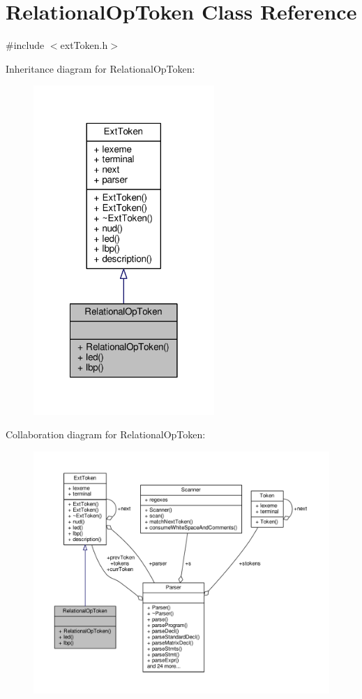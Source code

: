\hypertarget{classRelationalOpToken}{\section{Relational\-Op\-Token Class Reference}
\label{classRelationalOpToken}
}


{\ttfamily \#include $<$ext\-Token.\-h$>$}



Inheritance diagram for Relational\-Op\-Token\-:\nopagebreak
\begin{figure}[H]
\begin{center}
\leavevmode
\includegraphics[width=194pt]{classRelationalOpToken__inherit__graph}
\end{center}
\end{figure}


Collaboration diagram for Relational\-Op\-Token\-:\nopagebreak
\begin{figure}[H]
\begin{center}
\leavevmode
\includegraphics[width=350pt]{classRelationalOpToken__coll__graph}
\end{center}
\end{figure}
